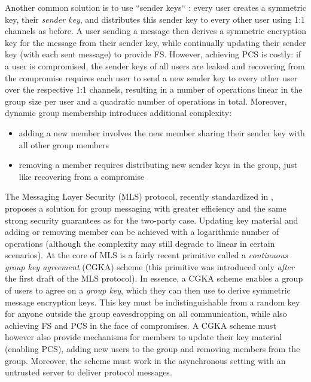 Another common solution is to use ``sender keys`` \cite{sender-keys}: every user creates a symmetric key, their \emph{sender key}, and distributes this sender key to every other user using 1:1 channels as before. A user sending a message then derives a symmetric encryption key for the message from their sender key, while continually updating their sender key (with each sent message) to provide FS. However, achieving PCS is costly: if a user is compromised, the sender keys of all users are leaked and recovering from the compromise requires each user to send a new sender key to every other user over the respective 1:1 channels, resulting in a number of operations linear in the group size per user and a quadratic number of operations in total. Moreover, dynamic group membership introduces additional complexity:
\begin{itemize}
	\item adding a new member involves the new member sharing their sender key with all other group members 
	\item removing a member requires distributing new sender keys in the group, just like recovering from a compromise
\end{itemize}
The Messaging Layer Security (MLS) protocol, recently standardized in \cite{rfc9420}, proposes a solution for group messaging with greater efficiency and the same strong security guarantees as for the two-party case. Updating key material and adding or removing member can be achieved with a logarithmic number of operations (although the complexity may still degrade to linear in certain scenarios). At the core of MLS is a fairly recent primitive called a \emph{continuous group key agreement} (CGKA) scheme \cite{rtreekem} (this primitive was introduced only \emph{after} the first draft of the MLS protocol). In essence, a CGKA scheme enables a group of users to agree on a \emph{group key}, which they can then use to derive symmetric message encryption keys. This key must be indistinguishable from a random key for anyone outside the group eavesdropping on all communication, while also achieving FS and PCS in the face of compromises. A CGKA scheme must however also provide mechanisms for members to update their key material (enabling PCS), adding new users to the group and removing members from the group. Moreover, the scheme must work in the asynchronous setting with an untrusted server to deliver protocol messages.

